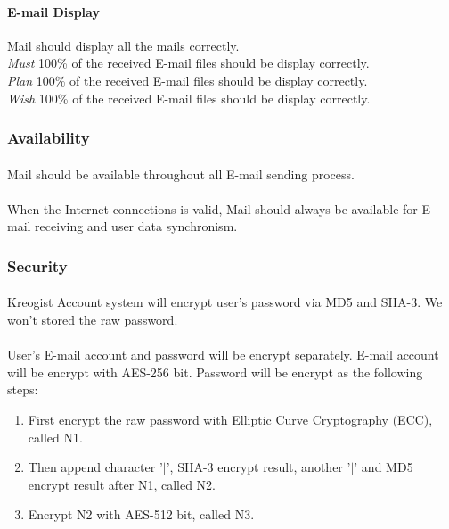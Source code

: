 \documentclass[11pt,a4paper]{article}
\begin{document}
				\paragraph{E-mail Display} Mail should display all the mails correctly.\\
				\emph{Must} 100\% of the received E-mail files should be display correctly.\\
				\emph{Plan} 100\% of the received E-mail files should be display correctly.\\
				\emph{Wish} 100\% of the received E-mail files should be display correctly.
            \subsubsection{Availability}
            	\paragraph{} Mail should be available throughout all E-mail sending process.
				\paragraph{} When the Internet connections is valid, Mail should always be available for E-mail receiving and user data synchronism.
            \subsubsection{Security}
            	\paragraph{} Kreogist Account system will encrypt user's password via MD5 and SHA-3. We won't stored the raw password.
				\paragraph{} User's E-mail account and password will be encrypt separately. E-mail account will be encrypt with AES-256 bit. Password will be encrypt as the following steps:
				\begin{enumerate}
					\item First encrypt the raw password with Elliptic Curve Cryptography (ECC), called N1.
					\item Then append character '$|$', SHA-3 encrypt result, another '$|$' and MD5 encrypt result after N1, called N2.
					\item Encrypt N2 with AES-512 bit, called N3.
				\end{enumerate}
\end{document}
